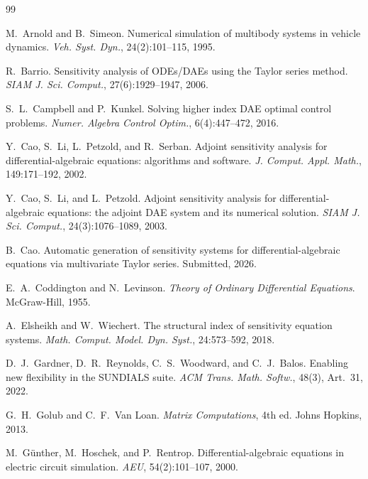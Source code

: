 \documentclass[12pt,a4paper]{article}
\theoremstyle{definition}
\theoremstyle{plain}
\theoremstyle{remark}
\begin{document}

\begin{thebibliography}{99}

M.\ Arnold and B.\ Simeon.
Numerical simulation of multibody systems in vehicle dynamics.
\textit{Veh. Syst. Dyn.}, 24(2):101--115, 1995.

R.\ Barrio.
Sensitivity analysis of ODEs/DAEs using the Taylor series method.
\textit{SIAM J. Sci. Comput.}, 27(6):1929--1947, 2006.

S.\ L.\ Campbell and P.\ Kunkel.
Solving higher index DAE optimal control problems.
\textit{Numer. Algebra Control Optim.}, 6(4):447--472, 2016.

Y.\ Cao, S.\ Li, L.\ Petzold, and R.\ Serban.
Adjoint sensitivity analysis for differential-algebraic equations: algorithms and software.
\textit{J. Comput. Appl. Math.}, 149:171--192, 2002.

Y.\ Cao, S.\ Li, and L.\ Petzold.
Adjoint sensitivity analysis for differential-algebraic equations: the adjoint DAE system and its numerical solution.
\textit{SIAM J. Sci. Comput.}, 24(3):1076--1089, 2003.

B.\ Cao.
Automatic generation of sensitivity systems for differential-algebraic equations via multivariate Taylor series.
Submitted, 2026.

E.\ A.\ Coddington and N.\ Levinson.
\textit{Theory of Ordinary Differential Equations}.
McGraw-Hill, 1955.

A.\ Elsheikh and W.\ Wiechert.
The structural index of sensitivity equation systems.
\textit{Math. Comput. Model. Dyn. Syst.}, 24:573--592, 2018.

D.\ J.\ Gardner, D.\ R.\ Reynolds, C.\ S.\ Woodward, and C.\ J.\ Balos.
Enabling new flexibility in the SUNDIALS suite.
\textit{ACM Trans. Math. Softw.}, 48(3), Art.\ 31, 2022.

G.\ H.\ Golub and C.\ F.\ Van Loan.
\textit{Matrix Computations}, 4th ed.
Johns Hopkins, 2013.

M.\ G\"{u}nther, M.\ Hoschek, and P.\ Rentrop.
Differential-algebraic equations in electric circuit simulation.
\textit{AEU}, 54(2):101--107, 2000.


\end{thebibliography}
\end{document}
